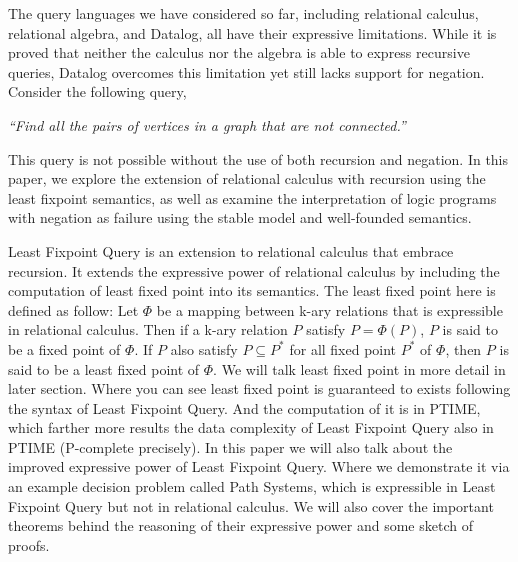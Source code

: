 The query languages we have considered so far, including relational calculus, 
relational algebra, and Datalog, all have their expressive limitations. While 
it is proved that neither the calculus nor the algebra is able to express 
recursive queries, Datalog overcomes this limitation yet still lacks support 
for negation. Consider the following query,
\begin{displayquote}
    \textit{``Find all the pairs of vertices in a 
    graph that are not connected.''}
\end{displayquote}
This query is not possible without the use of both recursion and negation. 
In this paper, we explore the extension of relational calculus with 
recursion using the least fixpoint semantics, as well as examine the interpretation  
of logic programs with negation as failure using the stable model 
and well-founded semantics.

Least Fixpoint Query is an extension to relational calculus that embrace recursion. It extends the expressive power of relational calculus by including the computation of least fixed point into its semantics. The least fixed point here is defined as follow: 
Let $\Phi$ be a mapping between k-ary relations that is expressible in relational calculus. Then if a k-ary relation $P$ satisfy $P= \Phi(P)$, $P$ is said to be a fixed point of $\Phi$. If $P$ also satisfy $P \subseteq P^*$ for all fixed point $P^*$ of $\Phi$, then $P$ is said to be a least fixed point of $\Phi$.
We will talk least fixed point in more detail in later section. Where you can see least fixed point is guaranteed to exists following the syntax of Least Fixpoint Query. And the computation of it is in PTIME, which farther more results the data complexity of Least Fixpoint Query also in PTIME (P-complete precisely). 
In this paper we will also talk about the improved expressive power of Least Fixpoint Query. Where we demonstrate it via an example decision problem called Path Systems, which is expressible in Least Fixpoint Query but not in relational calculus. We will also cover the important theorems behind the reasoning of their expressive power and some sketch of proofs.

